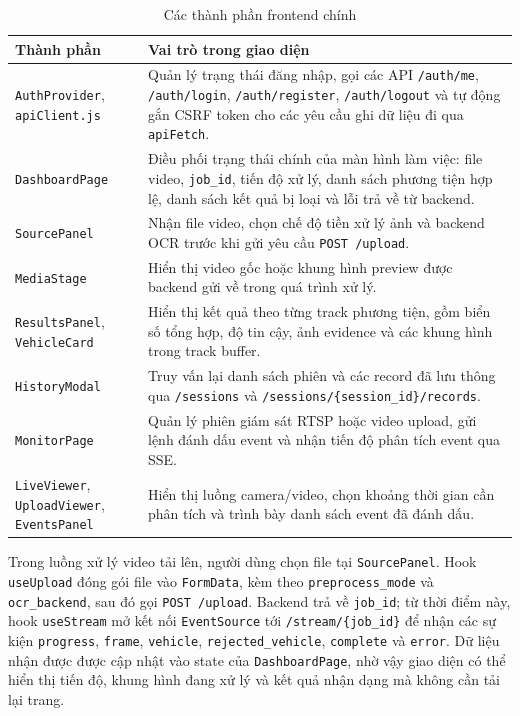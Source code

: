 \documentclass[../DoAn.tex]{subfiles}
\begin{document}
\begin{table}[htbp]
\centering
\renewcommand{\arraystretch}{1.15}
\begin{tabular}{|p{3.6cm}|p{9.8cm}|}
\hline
\textbf{Thành phần} & \textbf{Vai trò trong giao diện} \\ \hline
\texttt{AuthProvider}, \texttt{apiClient.js} & Quản lý trạng thái đăng nhập, gọi các API \texttt{/auth/me}, \texttt{/auth/login}, \texttt{/auth/register}, \texttt{/auth/logout} và tự động gắn CSRF token cho các yêu cầu ghi dữ liệu đi qua \texttt{apiFetch}. \\ \hline
\texttt{DashboardPage} & Điều phối trạng thái chính của màn hình làm việc: file video, \texttt{job\_id}, tiến độ xử lý, danh sách phương tiện hợp lệ, danh sách kết quả bị loại và lỗi trả về từ backend. \\ \hline
\texttt{SourcePanel} & Nhận file video, chọn chế độ tiền xử lý ảnh và backend OCR trước khi gửi yêu cầu \texttt{POST /upload}. \\ \hline
\texttt{MediaStage} & Hiển thị video gốc hoặc khung hình preview được backend gửi về trong quá trình xử lý. \\ \hline
\texttt{ResultsPanel}, \texttt{VehicleCard} & Hiển thị kết quả theo từng track phương tiện, gồm biển số tổng hợp, độ tin cậy, ảnh evidence và các khung hình trong track buffer. \\ \hline
\texttt{HistoryModal} & Truy vấn lại danh sách phiên và các record đã lưu thông qua \texttt{/sessions} và \texttt{/sessions/\{session\_id\}/records}. \\ \hline
\texttt{MonitorPage} & Quản lý phiên giám sát RTSP hoặc video upload, gửi lệnh đánh dấu event và nhận tiến độ phân tích event qua SSE. \\ \hline
\texttt{LiveViewer}, \texttt{UploadViewer}, \texttt{EventsPanel} & Hiển thị luồng camera/video, chọn khoảng thời gian cần phân tích và trình bày danh sách event đã đánh dấu. \\ \hline
\end{tabular}
\caption{Các thành phần frontend chính}
\label{table:frontend_components}
\end{table}

Trong luồng xử lý video tải lên, người dùng chọn file tại \texttt{SourcePanel}. Hook \texttt{useUpload} đóng gói file vào \texttt{FormData}, kèm theo \texttt{preprocess\_mode} và \texttt{ocr\_backend}, sau đó gọi \texttt{POST /upload}. Backend trả về \texttt{job\_id}; từ thời điểm này, hook \texttt{useStream} mở kết nối \texttt{EventSource} tới \texttt{/stream/\{job\_id\}} để nhận các sự kiện \texttt{progress}, \texttt{frame}, \texttt{vehicle}, \texttt{rejected\_vehicle}, \texttt{complete} và \texttt{error}. Dữ liệu nhận được được cập nhật vào state của \texttt{DashboardPage}, nhờ vậy giao diện có thể hiển thị tiến độ, khung hình đang xử lý và kết quả nhận dạng mà không cần tải lại trang.
\end{document}
